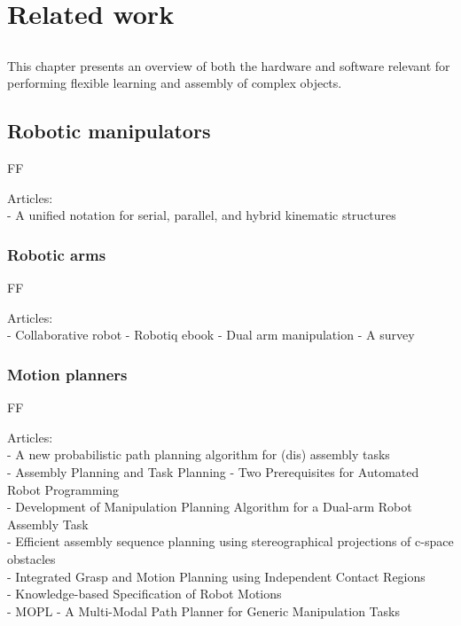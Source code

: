 \chapter{Related work}\label{chap:related-work}

\section*{}

This chapter presents an overview of both the hardware and software relevant for performing flexible learning and assembly of complex objects.


\section{Robotic manipulators}

FF

Articles:\\
- A unified notation for serial, parallel, and hybrid kinematic structures


\subsection{Robotic arms}

FF

Articles:\\
- Collaborative robot - Robotiq ebook
- Dual arm manipulation - A survey


\subsection{Motion planners}

FF


Articles:\\
- A new probabilistic path planning algorithm for (dis) assembly tasks\\
- Assembly Planning and Task Planning - Two Prerequisites for Automated Robot Programming\\
- Development of Manipulation Planning Algorithm for a Dual-arm Robot Assembly Task\\
- Efficient assembly sequence planning using stereographical projections of c-space obstacles\\
- Integrated Grasp and Motion Planning using Independent Contact Regions\\
- Knowledge-based Specification of Robot Motions\\
- MOPL - A Multi-Modal Path Planner for Generic Manipulation Tasks



